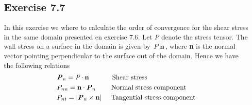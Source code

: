 \documentclass[a4paper,norsk]{article}
\begin{document}
\subsection*{Exercise 7.7}
In this exercise we where to calculate the order of convergence for the shear stress in the same domain presented en exercise 7.6.
Let \textit{P} denote the stress tensor. The wall stress on a surface in the domain is given by $\textit{P} \cdot \textbf{n}$, where \textbf{n} is the normal vector 
pointing perpendicular to the surface out of the domain. Hence we have the following relations
\begin{align*}
 &\textbf{\textit{P}}_n = \textit{P} \cdot \textbf{n} \hspace{12mm} \text{Shear stress} \\
        &P_{nn} = \textbf{n} \cdot \textbf{\textit{P}}_n \hspace{8mm} \text{Normal stress component} \\
        &P_{nt} = |\textbf{\textit{P}}_n \times \textbf{n}| \hspace{5mm} \text{Tangential stress component}
        \end{align*}
        
\end{document}
